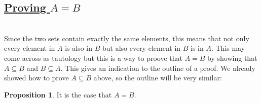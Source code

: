 \documentclass{amsart} %
\theoremstyle{definition} %
\theoremstyle{proposition} %
\newtheorem*{prpn}{Proposition}
\theoremstyle{remark} %
\begin{document}
\bigskip \bigskip \bigskip \bigskip

\subsection{\underline{Proving $A = B$}}

\hfill\\

 Since the two sets contain exactly the same elements, this means that not only every element in $A$ is also in $B$ but also every element in $B$ is in $A$. This may come across as tautology but this is a way to proove that $A = B$ by showing that $A \subseteq B$ and $B \subseteq A$. This gives an indication to the outline of a proof. We already showed how to prove $A \subseteq B$ above, so the outline will be very similar:

\begin{prpn}
      It is the case that $A = B$.
\end{prpn}
\end{document}
